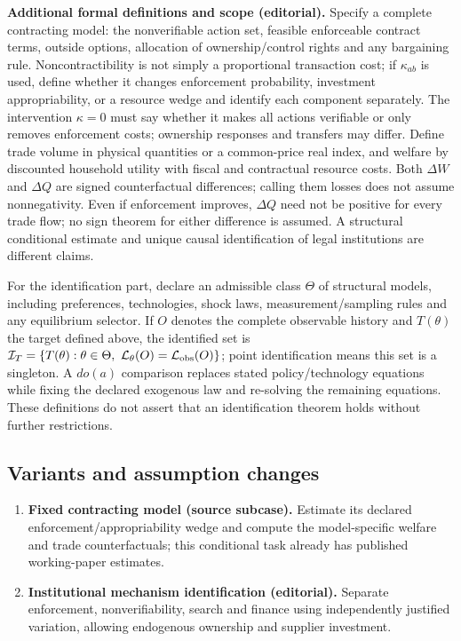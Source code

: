 \documentclass[11pt,a4paper]{article}
\begin{document}
\textbf{Additional formal definitions and scope (editorial).} Specify a complete contracting model: the nonverifiable action set, feasible enforceable contract terms, outside options, allocation of ownership/control rights and any bargaining rule. Noncontractibility is not simply a proportional transaction cost; if \(\kappa_{ab}\) is used, define whether it changes enforcement probability, investment appropriability, or a resource wedge and identify each component separately. The intervention \(\kappa=0\) must say whether it makes all actions verifiable or only removes enforcement costs; ownership responses and transfers may differ. Define trade volume in physical quantities or a common-price real index, and welfare by discounted household utility with fiscal and contractual resource costs. Both \(\Delta W\) and \(\Delta Q\) are signed counterfactual differences; calling them losses does not assume nonnegativity. Even if enforcement improves, \(\Delta Q\) need not be positive for every trade flow; no sign theorem for either difference is assumed. A structural conditional estimate and unique causal identification of legal institutions are different claims.

For the identification part, declare an admissible class \(\Theta\) of structural models, including preferences, technologies, shock laws, measurement/sampling rules and any equilibrium selector. If \(O\) denotes the complete observable history and \(T(\theta)\) the target defined above, the identified set is \(\mathcal I_T=\{T(\theta):\theta\in\Theta,\ \mathcal L_\theta(O)=\mathcal L_{\rm obs}(O)\}\); point identification means this set is a singleton. A \(do(a)\) comparison replaces stated policy/technology equations while fixing the declared exogenous law and re-solving the remaining equations. These definitions do not assert that an identification theorem holds without further restrictions.
\subsection*{Variants and assumption changes}
\begin{enumerate}
\item \textbf{Fixed contracting model (source subcase).} Estimate its declared enforcement/appropriability wedge and compute the model-specific welfare and trade counterfactuals; this conditional task already has published working-paper estimates.
\item \textbf{Institutional mechanism identification (editorial).} Separate enforcement, nonverifiability, search and finance using independently justified variation, allowing endogenous ownership and supplier investment.
\end{enumerate}
\end{document}
